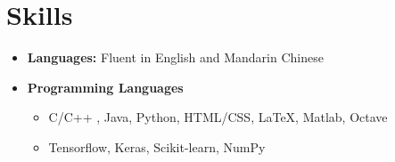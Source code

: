 \documentclass[letterpaper,11pt]{article}
\newcommand{\myitem}[1]{\item #1 \vspace{-9pt}}
\newcommand{\mysubitem}[1]{\item #1 \vspace{-4pt}}
\begin{document}
\section{Skills}
	\begin{itemize}[leftmargin=*]
		\myitem {\textbf{Languages:} Fluent in English and Mandarin Chinese}
		\myitem {\textbf{Programming Languages}}
			\begin{itemize}
				\mysubitem {C/C++ , Java, Python, HTML/CSS, \LaTeX, Matlab, Octave}
				\mysubitem {Tensorflow, Keras, Scikit-learn, NumPy}
			\end{itemize}
	\end{itemize}
\end{document}

